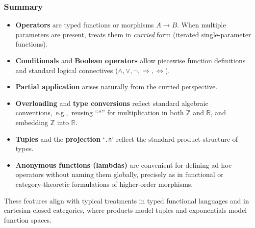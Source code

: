 \newpage
\subsubsection{Summary}
\begin{itemize}
	\item \textbf{Operators} are typed functions or morphisms \(A \to B\). When multiple parameters are present, \EasyCrypt treats them in \textit{curried} form (iterated single-parameter functions).
	\item \textbf{Conditionals} and \textbf{Boolean operators} allow piecewise function definitions and standard logical connectives (\(\land,\lor,\neg,\Rightarrow,\Leftrightarrow\)).
	\item \textbf{Partial application} arises naturally from the curried perspective.
	\item \textbf{Overloading} and \textbf{type conversions} reflect standard algebraic conventions,\ e.g.,\ reusing ``\(*\)'' for multiplication in both \(\mathbb{Z}\) and \(\mathbb{R}\), and embedding \(\mathbb{Z}\) into \(\mathbb{R}\).
	\item \textbf{Tuples} and the \textbf{projection} `\texttt{.n}' reflect the standard product structure of types.
	\item \textbf{Anonymous functions (lambdas)} are convenient for defining ad hoc operators without naming them globally, precisely as in functional or category-theoretic formulations of higher-order morphisms.
\end{itemize}
These features align with typical treatments in typed functional languages and in cartesian closed categories, where products model tuples and exponentials model function spaces.

\newpage
